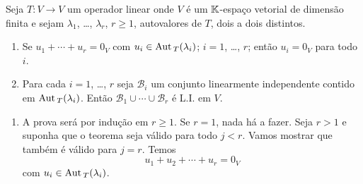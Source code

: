 \begin{teorema}
	Seja $T : V \to V$ um operador linear onde $V$ \'e um $\mathbb{K}$-espa\c{c}o vetorial de dimens\~ao finita e sejam $\lambda_1$, \dots, $\lambda_r$, $r \ge 1$, autovalores de $T$, dois a dois distintos.
	\begin{enumerate}[label=({\roman*})]
		\item Se $u_1 + \cdots + u_r = 0_V$ com $u_i \in {\rm Aut\,}_T(\lambda_i)$; $i = 1$, \dots, $r$; ent\~ao $u_i = 0_V$ para todo $i$.
		\item Para cada $i = 1$, \dots, $r$ seja $\mathcal{B}_i$ um conjunto linearmente independente contido em ${\rm Aut\,}_T(\lambda_i)$. Ent\~ao $\mathcal{B}_1 \cup \cdots \cup \mathcal{B}_r$ \'e L.I. em $V$.
	\end{enumerate}
\end{teorema}
\begin{prova}
	\begin{enumerate}[label=({\roman*})]
		\item A prova ser\'a por indu\c{c}\~ao em $r \ge 1$. Se $r = 1$, nada h\'a a fazer. Seja $r > 1$ e suponha que o teorema seja v\'alido para todo $j < r$. Vamos mostrar que tamb\'em \'e v\'alido para $j = r$. Temos
		\begin{equation}\label{equacaoauxiliar1}
			u_1 + u_2 + \cdots + u_r = 0_V
		\end{equation}
		com $u_i \in {\rm Aut\,}_T(\lambda_i)$.


\end{enumerate}
\end{prova}
